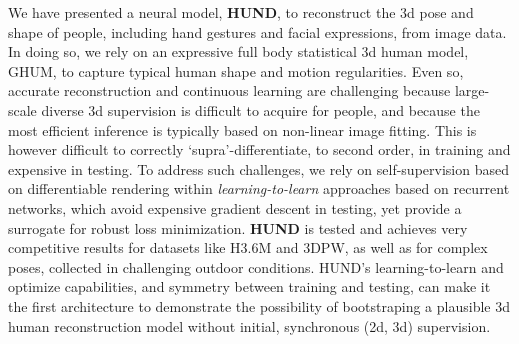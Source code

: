 \documentclass[final]{cvpr}
\begin{document}
We have presented a neural model, {\bf HUND}, to reconstruct the 3d pose and shape of people, including hand gestures and facial expressions, from image data. In doing so, we rely on an expressive full body statistical 3d human model, GHUM, to capture typical human shape and motion regularities. Even so, accurate reconstruction and continuous learning are challenging because large-scale diverse 3d supervision is difficult to acquire for people, and because the most efficient inference is typically based on non-linear image fitting. This is however difficult to correctly `supra'-differentiate, to second order, in training and expensive in testing. To address such challenges, we rely on self-supervision based on differentiable rendering within \emph{learning-to-learn} approaches based on recurrent networks, which avoid expensive gradient descent in testing, yet provide a surrogate for robust loss minimization. 
{\bf HUND} is tested and achieves very competitive results for datasets like H3.6M and 3DPW, as well as for complex poses, collected in challenging outdoor conditions. HUND's learning-to-learn and optimize capabilities, and symmetry between training and testing, can make it the first architecture to demonstrate the possibility of bootstraping a plausible 3d human reconstruction model without initial, synchronous (2d, 3d) supervision.










\clearpage
\balance
{\small


}
\end{document}
